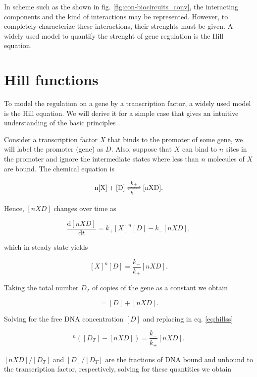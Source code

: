 In scheme such as the shown in fig. \ref{fig:con-biocircuits_conv}, the interacting components and the kind of interactions may be represented. However, to completely characterize these interactions, their strenghts must be given. A widely used model to quantify the strenght of gene regulation is the Hill equation.

\section{Hill functions}
\label{sec:hill}

To model the regulation on a gene by a transcription factor, a widely used model is the Hill equation. We will derive it for a simple case that gives an intuitive understanding of the basic principles \cite{alon06}.

Consider a transcription factor $X$ that binds to the promoter of some gene, we will label the promoter (gene) as $D$. Also, suppose that $X$ can bind to $n$ sites in the promoter and ignore the intermediate states where less than $n$ molecules of $X$ are bound. The chemical equation is

\begin{equation*}
  \ce{n[X] + [D]} \ce{<=>[k_+][k_-]} \ce{[nXD]}.
\end{equation*}

Hence, $[nXD]$ changes over time as

\begin{equation*}
  \frac{\mathrm{d}[nXD]}{\mathrm{d}t} = k_+[X]^n[D] - k_-[nXD],
\end{equation*}

which in steady state yields

\begin{equation}
  \label{eq:hillss}
  [X]^n[D] = \frac{k_-}{k_+}[nXD].
\end{equation}

Taking the total number $D_T$ of copies of the gene as a constant we obtain

\begin{equation*}
  [D_T] = [D]+[nXD].
\end{equation*}

Solving for the free DNA concentration $[D]$ and replacing in eq. \eqref{eq:hillss}

\begin{equation*}
  [X]^n\left([D_T]-[nXD]\right) = \frac{k_-}{k_+}[nXD].
\end{equation*}

$[nXD]/[D_T]$ and $[D]/[D_T]$ are the fractions of DNA bound and unbound to the transcription factor, respectively, solving for these quantities we obtain


